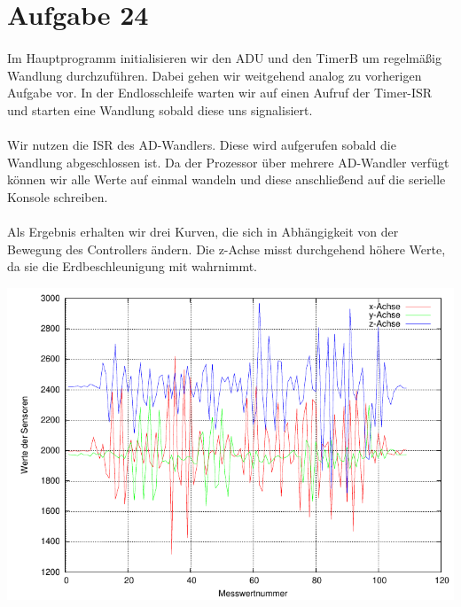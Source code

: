 \section{Aufgabe 24}

\paragraph*{}
Im Hauptprogramm initialisieren wir den ADU und den TimerB um regelmäßig Wandlung durchzuführen. Dabei gehen wir weitgehend analog zu vorherigen Aufgabe vor. In der Endlosschleife warten wir auf einen Aufruf der Timer-ISR und starten eine Wandlung sobald diese uns signalisiert. 



\paragraph*{}
Wir nutzen die ISR des AD-Wandlers. Diese wird aufgerufen sobald die Wandlung abgeschlossen ist. Da der Prozessor über mehrere AD-Wandler verfügt können wir alle Werte auf einmal wandeln und diese anschließend auf die serielle Konsole schreiben.  



\paragraph*{}
Als Ergebnis erhalten wir drei Kurven, die sich in Abhängigkeit von der Bewegung des Controllers ändern. Die z-Achse misst durchgehend höhere Werte, da sie die Erdbeschleunigung mit wahrnimmt.

\includegraphics[width=\textwidth]{graphs/accel.pdf}


